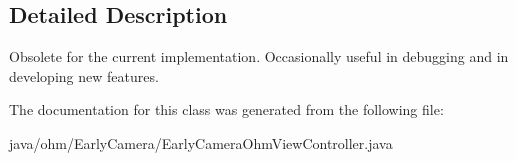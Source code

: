 \subsection{Detailed Description}
Obsolete for the current implementation. Occasionally useful in debugging and in developing new features. 

The documentation for this class was generated from the following file\+:\begin{DoxyCompactItemize}
\item 
java/ohm/\+Early\+Camera/Early\+Camera\+Ohm\+View\+Controller.\+java\end{DoxyCompactItemize}
